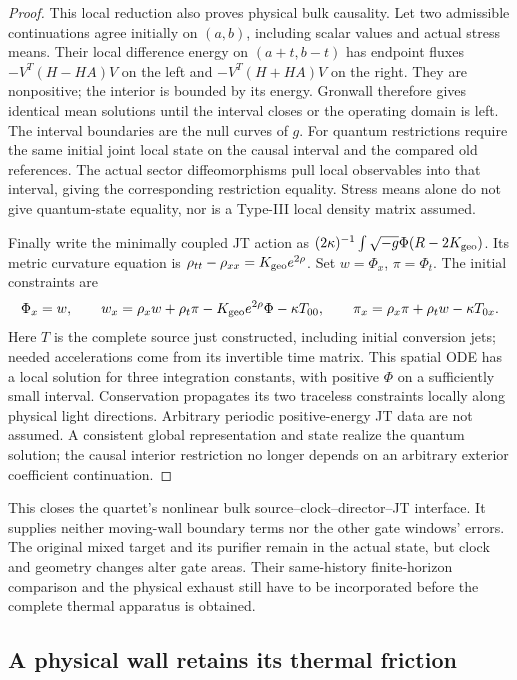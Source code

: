 \begin{proof}
This local reduction also proves physical bulk causality. Let two
admissible continuations agree initially on $(a,b)$, including scalar
values and actual stress means. Their local difference energy on
$(a+t,b-t)$ has endpoint fluxes
$-V^T(H-HA)V$ on the left and $-V^T(H+HA)V$ on the right.
They are nonpositive; the interior is bounded by its energy. Gronwall
therefore gives identical mean solutions until the interval closes or
the operating domain is left. The interval boundaries are the null
curves of $g$. For quantum restrictions require the same initial joint
local state on the causal interval and the compared old references.
The actual sector diffeomorphisms pull local observables into that
interval, giving the corresponding restriction equality. Stress means
alone do not give quantum-state equality, nor is a Type-III local
density matrix assumed.

Finally write the minimally coupled JT action as
$(2\kappa)^{-1}\int\sqrt{-g}\Phi(R-2K_{\rm geo})$.
Its metric curvature equation is
$\rho_{tt}-\rho_{xx}=K_{\rm geo}e^{2\rho}$.
Set $w=\Phi_x$, $\pi=\Phi_t$. The initial constraints are
\begin{equation}
 \Phi_x=w,\qquad
 w_x=\rho_xw+\rho_t\pi-K_{\rm geo}e^{2\rho}\Phi-\kappa T_{00},
 \qquad \pi_x=\rho_x\pi+\rho_tw-\kappa T_{0x}.             \label{eq:bulk-JT-constraints}
\end{equation}
Here $T$ is the complete source just constructed, including initial
conversion jets; needed accelerations come from its invertible time
matrix. This spatial ODE has a local solution for three integration
constants, with positive $\Phi$ on a sufficiently small interval.
Conservation propagates its two traceless constraints locally along
physical light directions. Arbitrary periodic positive-energy JT data
are not assumed. A consistent global representation and state realize
the quantum solution; the causal interior restriction no longer depends
on an arbitrary exterior coefficient continuation.
\end{proof}

This closes the quartet's nonlinear bulk source--clock--director--JT
interface. It supplies neither moving-wall boundary terms nor the
other gate windows' errors. The original mixed target and its purifier
remain in the actual state, but clock and geometry changes alter gate
areas. Their same-history finite-horizon comparison and the physical
exhaust still have to be incorporated before the complete thermal
apparatus is obtained.

\subsection{A physical wall retains its thermal friction}
\label{app:Dirac-wall-response}

